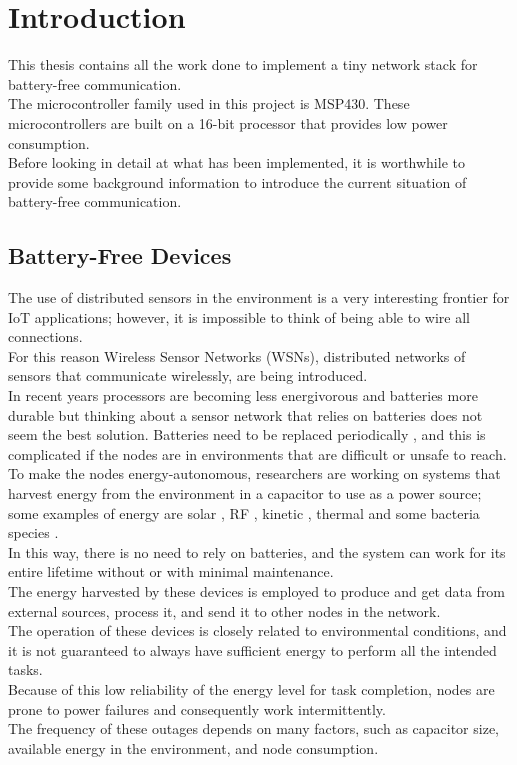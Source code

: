 \chapter{Introduction}
\label{cha:intro}
This thesis contains all the work done to implement a tiny network stack for battery-free communication.\\
The microcontroller family used in this project is MSP430. These microcontrollers are built on a 16-bit processor that provides low power consumption.\\
Before looking in detail at what has been implemented, it is worthwhile to provide some background information to introduce the current situation of battery-free communication.\\
\section{Battery-Free Devices}
\label{sec:batteryFreeDevices}
The use of distributed sensors in the environment is a very interesting frontier for IoT applications; however, it is impossible to think of being able to wire all connections.\\
For this reason Wireless Sensor Networks (WSNs), distributed networks of sensors that communicate wirelessly, are being introduced.\\
In recent years processors are becoming less energivorous and batteries more durable but thinking about a sensor network that relies on batteries does not seem the best solution.
Batteries need to be replaced periodically \cite{BatteryDegradation}, and this is complicated if the nodes are in environments that are difficult or unsafe to reach.\\
To make the nodes energy-autonomous, researchers are working on systems that harvest energy from the environment in a capacitor to use as a power source; some examples of energy are solar \cite{7479815}, RF \cite{article} , kinetic \cite{KineticEnergy}, thermal \cite{ThermalEnergy} and some  bacteria species \cite{10.1145/3362053.3363491}.\\
In this way, there is no need to rely on batteries, and the system can work for its entire lifetime without \cite{ManteinanceWSN} or with minimal maintenance.\\
The energy harvested by these devices is employed to produce and get data from external sources, process it, and send it to other nodes in the network.\\
The operation of these devices is closely related to environmental conditions, and it is not guaranteed to always have sufficient energy to perform all the intended tasks. \\
Because of this low reliability of the energy level for task completion, nodes are prone to power failures and consequently work intermittently.\\ 
The frequency of these outages depends on many factors, such as capacitor size, available energy in the environment, and node consumption.\\
